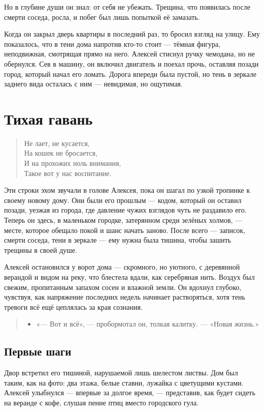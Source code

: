 \documentclass[12pt,a4paper]{book}
\newenvironment{dialogue}{\begin{quote}\itshape\begin{itemize}\item[]}{\end{itemize}\end{quote}}
\begin{document}
Но в глубине души он знал: от себя не убежать. Трещина, что появилась после смерти соседа, росла, и побег был лишь попыткой её замазать.

Когда он закрыл дверь квартиры в последний раз, то бросил взгляд на улицу. Ему показалось, что в тени дома напротив кто-то стоит — тёмная фигура, неподвижная, смотрящая прямо на него. Алексей стиснул ручку чемодана, но не обернулся. Сев в машину, он включил двигатель и поехал прочь, оставляя позади город, который начал его ломать. Дорога впереди была пустой, но тень в зеркале заднего вида осталась с ним — невидимая, но ощутимая.

\chapter{Тихая гавань}

\begin{verse}
Не лает, не кусается,\\
На кошек не бросается,\\
И на прохожих ноль внимания,\\
Такое вот у нас воспитание.
\end{verse}

Эти строки эхом звучали в голове Алексея, пока он шагал по узкой тропинке к своему новому дому. Они были его прошлым — кодом, который он оставил позади, уезжая из города, где давление чужих взглядов чуть не раздавило его. Теперь он здесь, в маленьком городке, затерянном среди зелёных холмов, — месте, которое обещало покой и шанс начать заново. После всего — записок, смерти соседа, тени в зеркале — ему нужна была тишина, чтобы зашить трещины в своей душе.

Алексей остановился у ворот дома — скромного, но уютного, с деревянной верандой и видом на реку, что блестела вдали, как серебряная нить. Воздух был свежим, пропитанным запахом сосен и влажной земли. Он вдохнул глубоко, чувствуя, как напряжение последних недель начинает растворяться, хотя тень тревоги всё ещё цеплялась за края сознания.

\begin{dialogue}
«— Вот и всё», — пробормотал он, толкая калитку. — «Новая жизнь.»
\end{dialogue}

\section{Первые шаги}

Двор встретил его тишиной, нарушаемой лишь шелестом листвы. Дом был таким, как на фото: два этажа, белые ставни, лужайка с цветущими кустами. Алексей улыбнулся — впервые за долгое время, — представив, как будет сидеть на веранде с кофе, слушая пение птиц вместо городского гула.
\end{document}
